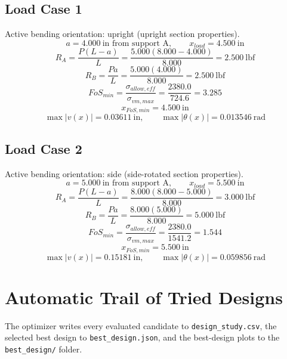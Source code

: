 \documentclass[11pt]{article}
\begin{document}
\subsection*{Load Case 1}
Active bending orientation: upright (upright section properties).
\[a = 4.000\ \mathrm{in} \text{ from support A}, \qquad x_{load} = 4.500\ \mathrm{in}\]
\[R_A = \frac{P(L-a)}{L} = \frac{5.000(8.000-4.000)}{8.000} = 2.500\ \mathrm{lbf}\]
\[R_B = \frac{Pa}{L} = \frac{5.000(4.000)}{8.000} = 2.500\ \mathrm{lbf}\]
\[FoS_{min} = \frac{\sigma_{allow,eff}}{\sigma_{vm,max}} = \frac{2380.0}{724.6} = 3.285\]
\[x_{FoS,min} = 4.500\ \mathrm{in}\]
\[\max |v(x)| = 0.03611\ \mathrm{in}, \qquad \max |\theta(x)| = 0.013546\ \mathrm{rad}\]
\subsection*{Load Case 2}
Active bending orientation: side (side-rotated section properties).
\[a = 5.000\ \mathrm{in} \text{ from support A}, \qquad x_{load} = 5.500\ \mathrm{in}\]
\[R_A = \frac{P(L-a)}{L} = \frac{8.000(8.000-5.000)}{8.000} = 3.000\ \mathrm{lbf}\]
\[R_B = \frac{Pa}{L} = \frac{8.000(5.000)}{8.000} = 5.000\ \mathrm{lbf}\]
\[FoS_{min} = \frac{\sigma_{allow,eff}}{\sigma_{vm,max}} = \frac{2380.0}{1541.2} = 1.544\]
\[x_{FoS,min} = 5.500\ \mathrm{in}\]
\[\max |v(x)| = 0.15181\ \mathrm{in}, \qquad \max |\theta(x)| = 0.059856\ \mathrm{rad}\]

\section*{Automatic Trail of Tried Designs}
The optimizer writes every evaluated candidate to \texttt{design\_study.csv}, the selected best design to \texttt{best\_design.json}, and the best-design plots to the \texttt{best\_design/} folder.
\end{document}
